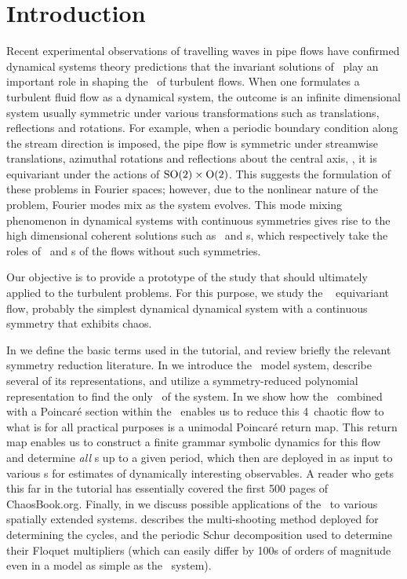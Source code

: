 \section{Introduction}
\label{s:intro}

Recent experimental observations of travelling waves in pipe flows have
confirmed dynamical systems theory predictions that the invariant
solutions of \NSe\ play an important role in shaping the \statesp\ of turbulent
flows. When one formulates a turbulent fluid flow as a
dynamical system, the outcome is an infinite dimensional system usually
symmetric under various transformations such as translations,
reflections and rotations. For example, when a periodic boundary
condition along the stream direction is imposed, the pipe flow is symmetric
under streamwise translations, azimuthal rotations and reflections about
the central axis, \ie, it is equivariant under the actions of
$\textrm{SO}(2) \times \textrm{O}(2)$. This
suggests the formulation of these problems in Fourier spaces; however,
due to the nonlinear nature of the problem, Fourier modes mix as the
system evolves. This mode mixing phenomenon in dynamical systems with continuous
symmetries gives rise to the high dimensional coherent solutions
such as \reqva\ and \rpo s, which respectively take the roles of \eqva\ and 
\po s of the flows without such symmetries. 

Our objective is to provide a prototype of the study that should
ultimately applied to the turbulent problems. For this purpose, we study
the \twomode\  equivariant flow, probably the simplest dynamical
dynamical system with a continuous symmetry that exhibits chaos.

In  we define the basic terms used in the tutorial, and
review briefly the relevant symmetry reduction literature.
In  we introduce the \twomode\ model system, describe
several of its representations, and
utilize a symmetry-reduced polynomial representation to find the only \reqv\
of the system.
In  we show how the \mslices\ combined with a
Poincar\'e section within the \slice\ enables us to reduce this 4\dmn\
chaotic flow to what is for all practical purposes is a unimodal Poincar\'e
return map. This return map enables us to construct a finite grammar
symbolic dynamics for
this flow and determine {\em all} \rpo s up to a given period, which
then are deployed
in \refsect{s:DynAvers} as input to various {\cycForm s} for estimates
of dynamically interesting observables.
A reader who gets this far in the tutorial has essentially covered the
first 500 pages of  {ChaosBook.org}.
Finally, in \refsect{s:concl} we discuss possible applications of the
\mslices\ to various spatially extended systems.
\refAppe{s:newton} describes the multi-shooting method deployed for
determining the cycles,
and
 the periodic Schur decomposition used to determine
their Floquet multipliers (which can easily differ by 100s of orders of
magnitude even in a model as simple as the \twomode\ system).
